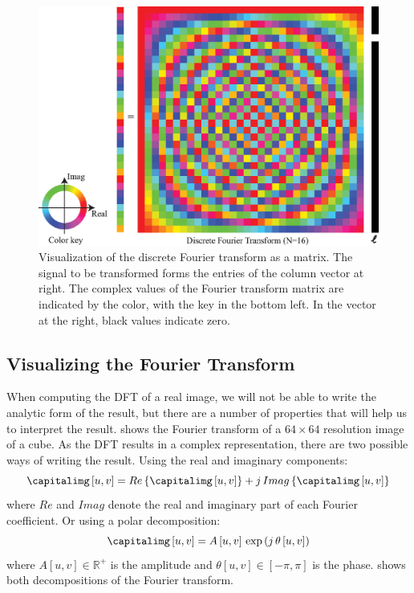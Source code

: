 \begin{figure}[t]
	\centerline{
		\includegraphics[width=0.7\linewidth]{figures/Image_processing_fourier/visualization_DFT_color.eps}}
	\caption{Visualization of the discrete Fourier transform as a matrix.  The signal to be
		transformed forms the entries of the column vector at right.  The
		complex values of the Fourier transform matrix are indicated by the color,
		with the key in the bottom left.  In the vector at the right, black
		values indicate zero.
	}
	\label{fig:colorDFT}
\end{figure}

\subsection{Visualizing the Fourier Transform}


When computing the DFT of a real image, we will not be able to write the analytic form of the result, but there are a number of properties that will help us to interpret the result. \Fig{\ref{fig:DFT_a}} shows the Fourier transform of a $64 \times 64$ resolution image of a cube.
As the DFT results in a complex representation, there are two possible ways of writing the result. Using the real and imaginary components:
\begin{equation}
	\capitalimg \left[u,v \right] = Re \left\{\capitalimg \left[u,v \right] \right\}  + j \, Imag \left\{\capitalimg \left[u,v \right] \right\}
\end{equation}
where $Re$ and $Imag$ denote the real and imaginary part of each Fourier coefficient. Or using a polar decomposition:
\begin{equation}
	\capitalimg \left[u,v \right]  = A \left[u,v \right] \, \exp{\left( j \, \theta\left[u,v \right]  \right)}
\end{equation}
where $A \left[u,v \right] \in \mathbb{R}^+$ is the amplitude and $\theta \left[u,v \right] \in \left[-\pi, \pi \right]$ is the phase.
\Fig{\ref{fig:DFT_a}} shows both decompositions of the Fourier transform.


